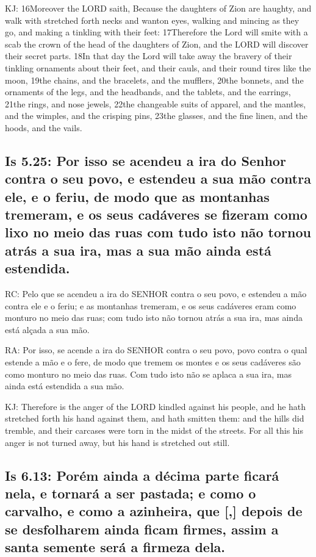 KJ: 16Moreover the LORD saith, Because the daughters of Zion are haughty, and walk with stretched forth necks and wanton eyes, walking and mincing as they go, and making a tinkling with their feet: 17Therefore the Lord will smite with a scab the crown of the head of the daughters of Zion, and the LORD will discover their secret parts. 18In that day the Lord will take away the bravery of their tinkling ornaments about their feet, and their cauls, and their round tires like the moon, 19the chains, and the bracelets, and the mufflers, 20the bonnets, and the ornaments of the legs, and the headbands, and the tablets, and the earrings, 21the rings, and nose jewels, 22the changeable suits of apparel, and the mantles, and the wimples, and the crisping pins, 23the glasses, and the fine linen, and the hoods, and the vails.

\subsection{Is 5.25: Por isso se acendeu a ira do Senhor contra o seu povo, e estendeu a sua mão contra ele, e o feriu, de modo que as montanhas tremeram, e os seus cadáveres se fizeram como lixo no meio das ruas\uwave{;} com tudo isto não tornou atrás a sua ira, mas a sua mão ainda está estendida.}

RC: Pelo que se acendeu a ira do SENHOR contra o seu povo, e estendeu a mão contra ele e o feriu; e as montanhas tremeram, e os seus cadáveres eram como monturo no meio das ruas; com tudo isto não tornou atrás a sua ira, mas ainda está alçada a sua mão.

RA: Por isso, se acende a ira do SENHOR contra o seu povo, povo contra o qual estende a mão e o fere, de modo que tremem os montes e os seus cadáveres são como monturo no meio das ruas. Com tudo isto não se aplaca a sua ira, mas ainda está estendida a sua mão.

KJ: Therefore is the anger of the LORD kindled against his people, and he hath stretched forth his hand against them, and hath smitten them: and the hills did tremble, and their carcases were torn in the midst of the streets. For all this his anger is not turned away, but his hand is stretched out still.

\subsection{Is 6.13: Porém ainda a décima parte ficará nela, e tornará a ser pastada; e como o carvalho, e como a azinheira, que [,] depois de se desfolharem\uwave{,} ainda ficam firmes, assim a santa semente será a firmeza dela.}

